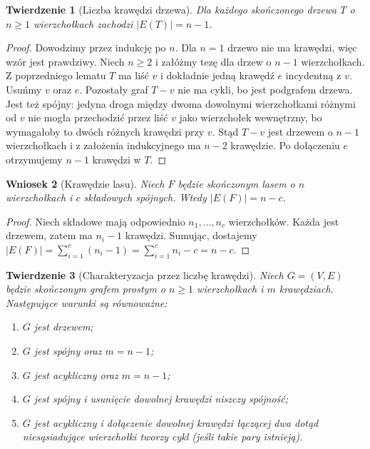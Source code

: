 \documentclass[11pt,a4paper]{report}
\numberwithin{equation}{section}
\theoremstyle{plain}
\newtheorem{twierdzenie}{Twierdzenie}[section]
\newtheorem{wniosek}[twierdzenie]{Wniosek}
\theoremstyle{definition}
\theoremstyle{remark}
\begin{document}
\begin{twierdzenie}[Liczba krawędzi drzewa]
Dla każdego skończonego drzewa $T$ o $n\ge1$
wierzchołkach zachodzi $|E(T)|=n-1$.
\end{twierdzenie}

\begin{proof}
Dowodzimy przez indukcję po $n$. Dla $n=1$
drzewo nie ma krawędzi, więc wzór jest prawdziwy.
Niech $n\ge2$ i załóżmy tezę dla drzew o $n-1$
wierzchołkach. Z poprzedniego lematu $T$ ma
liść $v$ i dokładnie jedną krawędź $e$ incydentną
z $v$. Usuńmy $v$ oraz $e$. Pozostały graf $T-v$
nie ma cykli, bo jest podgrafem drzewa. Jest
też spójny: jedyna droga między dwoma dowolnymi
wierzchołkami różnymi od $v$ nie mogła przechodzić
przez liść $v$ jako wierzchołek wewnętrzny, bo
wymagałoby to dwóch różnych krawędzi przy $v$.
Stąd $T-v$ jest drzewem o $n-1$ wierzchołkach
i z założenia indukcyjnego ma $n-2$ krawędzie.
Po dołączeniu $e$ otrzymujemy $n-1$ krawędzi w $T$.
\end{proof}

\begin{wniosek}[Krawędzie lasu]
Niech $F$ będzie skończonym lasem o $n$ wierzchołkach
i $c$ składowych spójnych. Wtedy $|E(F)|=n-c$.
\end{wniosek}

\begin{proof}
Niech składowe mają odpowiednio $n_1,\ldots,n_c$
wierzchołków. Każda jest drzewem, zatem ma
$n_i-1$ krawędzi. Sumując, dostajemy
$|E(F)|=\sum_{i=1}^{c}(n_i-1)
=\sum_{i=1}^{c}n_i-c=n-c$.
\end{proof}

\begin{twierdzenie}[Charakteryzacja przez liczbę krawędzi]
Niech $G=(V,E)$ będzie skończonym grafem prostym
o $n\ge1$ wierzchołkach i $m$ krawędziach.
Następujące warunki są równoważne:
\begin{enumerate}[label=(\roman*)]
\item $G$ jest drzewem;
\item $G$ jest spójny oraz $m=n-1$;
\item $G$ jest acykliczny oraz $m=n-1$;
\item $G$ jest spójny i usunięcie dowolnej
krawędzi niszczy spójność;
\item $G$ jest acykliczny i dołączenie dowolnej
krawędzi łączącej dwa dotąd niesąsiadujące
wierzchołki tworzy cykl (jeśli takie pary istnieją).
\end{enumerate}
\end{twierdzenie}
\end{document}
